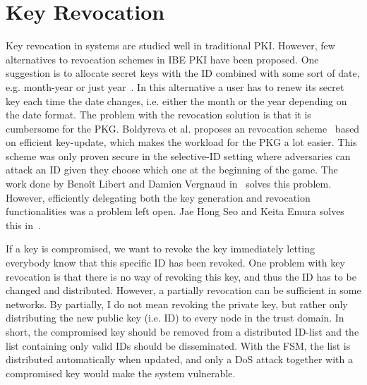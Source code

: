 \section{Key Revocation}
Key revocation in systems are studied well in traditional \gls{PKI}.
However, few alternatives to revocation schemes in \gls{IBE} \gls{PKI} have been proposed.
One suggestion is to allocate secret keys with the \gls{ID} combined with some sort of date, e.g. month-year or just year~\cite[section 1.1.1]{DBLP:conf/crypto/BonehF01}. 
In this alternative a user has to renew its secret key each time the date changes, i.e. either the month or the year depending on the date format.
The problem with the revocation solution is that it is cumbersome for the \gls{PKG}.
Boldyreva et al. proposes an revocation scheme~\cite{DBLP:journals/iacr/BoldyrevaGK12} based on efficient key-update, which makes the workload for the \gls{PKG} a lot easier. 
This scheme was only proven secure in the selective-ID setting where adversaries can attack an \gls{ID} given they choose which one at the beginning of the game.
The work done by Beno\^{i}t Libert and Damien Vergnaud in~\cite{DBLP:conf/ctrsa/LibertV09} solves this problem. 
However, efficiently delegating both the key generation and revocation functionalities was a problem left open.
Jae Hong Seo and Keita Emura solves this in~\cite{DBLP:journals/iacr/SeoE13a}.

If a key is compromised, we want to revoke the key immediately letting everybody know that this specific \gls{ID} has been revoked. 
One problem with key revocation is that there is no way of revoking this key, and thus the \gls{ID} has to be changed and distributed. 
However, a partially revocation can be sufficient in some networks. 
By partially, I do not mean revoking the private key, but rather only distributing the new public key (i.e. \gls{ID}) to every node in the trust domain.
In short, the compromised key should be removed from a distributed ID-list and the list containing only valid \gls{ID}s should be disseminated.
With the \gls{FSM}, the list is distributed automatically when updated, and only a \gls{DoS} attack together with a compromised key would make the system vulnerable. 
